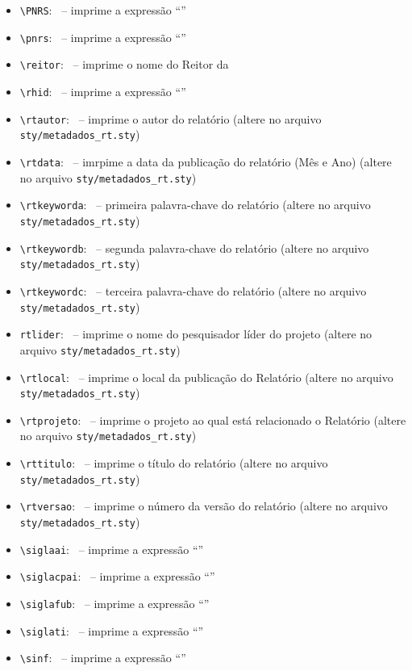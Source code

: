 \begin{itemize}
 \item \verb|\PNRS|: \PNRS\ -- imprime a expressão ``\PNRS''
 \item \verb|\pnrs|: \pnrs\  -- imprime a expressão ``\pnrs''
 \item \verb|\reitor|: \reitor\ -- imprime o nome do Reitor da \unb 
 \item \verb|\rhid|: \rhid\ -- imprime a expressão ``\rhid''
 \item \verb|\rtautor|: \rtautor\ -- imprime o autor do relatório (altere no arquivo \verb|sty/metadados_rt.sty|)
 \item \verb|\rtdata|: \rtdata\ --   imrpime a data da publicação do relatório (Mês e Ano) (altere no arquivo \verb|sty/metadados_rt.sty|)
 \item \verb|\rtkeyworda|: \rtkeyworda\ -- primeira palavra-chave do relatório (altere no arquivo \verb|sty/metadados_rt.sty|)
 \item \verb|\rtkeywordb|: \rtkeywordb\ -- segunda palavra-chave do relatório (altere no arquivo \verb|sty/metadados_rt.sty|)
 \item \verb|\rtkeywordc|: \rtkeywordc\ -- terceira palavra-chave do relatório (altere no arquivo \verb|sty/metadados_rt.sty|)
 \item \verb|rtlider|: \rtlider\ -- imprime o nome do pesquisador líder do projeto (altere no arquivo \verb|sty/metadados_rt.sty|)
 \item \verb|\rtlocal|: \rtlocal\ -- imprime o local da publicação do Relatório (altere no arquivo \verb|sty/metadados_rt.sty|)
 \item \verb|\rtprojeto|: \rtprojeto\ -- imprime o projeto ao qual está relacionado o Relatório (altere no arquivo \verb|sty/metadados_rt.sty|)
 \item \verb|\rttitulo|: \rttitulo\ --   imprime o título do relatório (altere no arquivo \verb|sty/metadados_rt.sty|)
 \item \verb|\rtversao|: \rtversao\ --   imprime o número da versão do relatório (altere no arquivo \verb|sty/metadados_rt.sty|)
 \item \verb|\siglaai|: \siglaai\ -- imprime a expressão ``\siglaai''
 \item \verb|\siglacpai|: \siglacpai\ -- imprime a expressão ``\siglacpai''
 \item \verb|\siglafub|: \siglafub\  -- imprime a expressão ``\siglafub''
 \item \verb|\siglati|: \siglati\  -- imprime a expressão ``\siglati''
 \item \verb|\sinf|: \sinf\  -- imprime a expressão ``\sinf''

\end{itemize}

